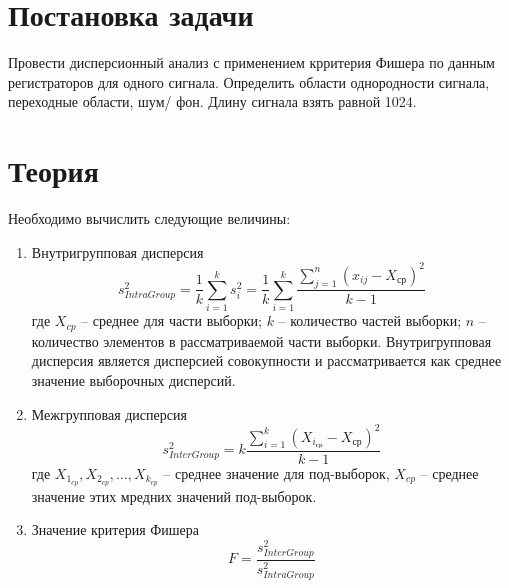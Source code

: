 \documentclass[a4paper]{article}
\begin{document}
    
    \tableofcontents
    \newpage
	\listoffigures
    \newpage
    \listoftables
    \newpage

\section {Постановка задачи}
\noindent Провести дисперсионный анализ с применением крритерия Фишера по данным регистраторов для одного сигнала.
Определить области однородности сигнала, переходные области, шум/ фон.
Длину сигнала взять равной 1024.

\section{Теория}
\noindent Необходимо вычислить следующие величины:
\begin{enumerate}
    \item Внутригрупповая дисперсия
    \begin{equation}
        s_{IntraGroup}^{2} = \frac{1}{k} \sum_{i=1}^{k} s_i^{2} = \frac{1}{k} \sum_{i=1}^{k} \frac{\sum_{j=1}^{n} (x_{ij}-X_{ср})^{2}}{k-1}
    \end{equation}
    где $X_{cp}$ -- среднее для части выборки; $k$ -- количество частей выборки; $n$ -- количество элементов в рассматриваемой части выборки.
    Внутригрупповая дисперсия является дисперсией совокупности и рассматривается как среднее значение выборочных дисперсий.
    \item Межгрупповая дисперсия
    \begin{equation}
            s_{InterGroup}^{2}  = k \frac{\sum_{i=1}^{k} (X_{i_{ср}}-X_{ср})^{2}}{k-1}
    \end{equation}
    где $X_{1_{cp}}, X_{2_{cp}}, \dots, X_{k_{cp}}$ -- среднее значение для под-выборок, $X_{cp}$ -- среднее значение этих мредних значений под-выборок.
    \item Значение критерия Фишера
    \begin{equation}
        F=\frac{s_{InterGroup}^{2}}{s_{IntraGroup}^{2}}
    \end{equation}
\end{enumerate}
\end{document}
